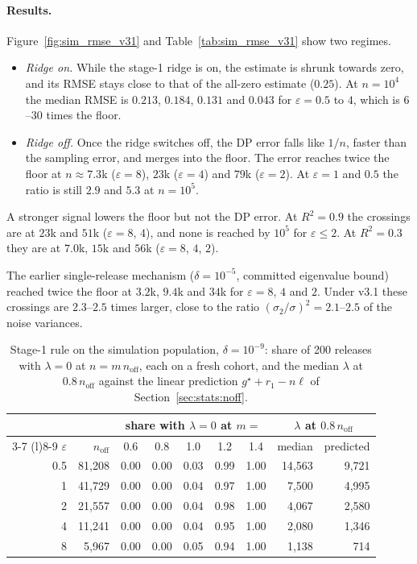 \paragraph{Results.} Figure~\ref{fig:sim_rmse_v31} and Table~\ref{tab:sim_rmse_v31} show two regimes.
\begin{itemize}[noitemsep]
  \item \emph{Ridge on.} While the stage-1 ridge is on, the estimate is shrunk towards zero, and its RMSE stays close to that of the all-zero estimate ($0.25$). At $n = 10^{4}$ the median RMSE is $0.213$, $0.184$, $0.131$ and $0.043$ for $\varepsilon = 0.5$ to $4$, which is $6$--$30$ times the floor.
  \item \emph{Ridge off.} Once the ridge switches off, the DP error falls like $1/n$, faster than the sampling error, and merges into the floor. The error reaches twice the floor at $n \approx 7.3$k ($\varepsilon = 8$), $23$k ($\varepsilon = 4$) and $79$k ($\varepsilon = 2$). At $\varepsilon = 1$ and $0.5$ the ratio is still $2.9$ and $5.3$ at $n = 10^{5}$.
\end{itemize}
A stronger signal lowers the floor but not the DP error. At $R^2 = 0.9$ the crossings are at $23$k and $51$k ($\varepsilon = 8$, $4$), and none is reached by $10^5$ for $\varepsilon \le 2$. At $R^2 = 0.3$ they are at $7.0$k, $15$k and $56$k ($\varepsilon = 8$, $4$, $2$).

The earlier single-release mechanism ($\delta = 10^{-5}$, committed eigenvalue bound) reached twice the floor at $3.2$k, $9.4$k and $34$k for $\varepsilon = 8$, $4$ and $2$. Under v3.1 these crossings are $2.3$--$2.5$ times larger, close to the ratio $(\sigma_2/\sigma)^2 = 2.1$--$2.5$ of the noise variances.

\begin{table}[t]
  \centering
  \small
  \caption{Stage-1 rule on the simulation population, $\delta = 10^{-9}$: share of 200 releases with $\lambda = 0$ at $n = m\, n_{\mathrm{off}}$, each on a fresh cohort, and the median $\lambda$ at $0.8\,n_{\mathrm{off}}$ against the linear prediction $g^\star + r_1 - n\ell$ of Section~\ref{sec:stats:noff}.}
  \label{tab:noff_check_v31}
  \begin{tabular}{@{}rrcccccrr@{}}
    \toprule
    & & \multicolumn{5}{c}{share with $\lambda = 0$ at $m =$} & \multicolumn{2}{c}{$\lambda$ at $0.8\,n_{\mathrm{off}}$} \\
    \cmidrule(lr){3-7} \cmidrule(l){8-9}
    $\varepsilon$ & $n_{\mathrm{off}}$ & 0.6 & 0.8 & 1.0 & 1.2 & 1.4 & median & predicted \\
    \midrule
    0.5 & 81{,}208 & 0.00 & 0.00 & 0.03 & 0.99 & 1.00 & 14{,}563 & 9{,}721 \\
    1 & 41{,}729 & 0.00 & 0.00 & 0.04 & 0.97 & 1.00 & 7{,}500 & 4{,}995 \\
    2 & 21{,}557 & 0.00 & 0.00 & 0.04 & 0.98 & 1.00 & 4{,}067 & 2{,}580 \\
    4 & 11{,}241 & 0.00 & 0.00 & 0.04 & 0.95 & 1.00 & 2{,}080 & 1{,}346 \\
    8 & 5{,}967 & 0.00 & 0.00 & 0.05 & 0.94 & 1.00 & 1{,}138 & 714 \\
    \bottomrule
  \end{tabular}
\end{table}


